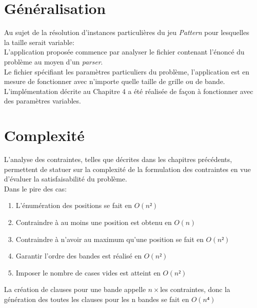 \documentclass[a4paper,12pt]{report}
\begin{document}
\section{Généralisation}
Au sujet de la résolution d'instances particulières du jeu \textit{Pattern} pour lesquelles la taille serait variable:\\

L'application proposée commence par analyser le fichier contenant l'énoncé du problème au moyen d'un \textit{parser}.\\
Le fichier spécifiant les paramètres particuliers du problème, l'application est en mesure de fonctionner avec n'importe quelle taille de grille ou de bande. \\

L'implémentation décrite au Chapitre 4 a été réalisée de façon à fonctionner avec des paramètres variables.\\
\section{Complexité}
%
%
%
%
L'analyse des contraintes, telles que décrites dans les chapitres précédents, permettent de statuer sur la complexité de la formulation des contraintes en vue d'évaluer la satisfaisabilité du problème.\\

Dans le pire des cas:
\begin{enumerate}
\item L'énumération des positions se fait en $O(n²)$
\item Contraindre à au moins une position est obtenu en $O(n)$
\item Contraindre à n'avoir au maximum qu'une position se fait en $O(n²)$
\item Garantir l'ordre des bandes est réalisé en $O(n²)$
\item Imposer le nombre de cases vides est atteint en $O(n²)$\\
\end{enumerate}
La création de clauses pour une bande appelle $n\times$les contraintes, donc la génération des toutes les clauses pour les n bandes se fait en $O(n⁴)$
\end{document}
